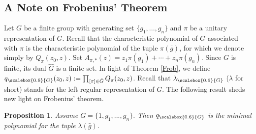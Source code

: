 \documentclass[draft, 12pt, reqno]{amsart}
\newcommand{\lb}{{\lambda}}
\numberwithin{equation}{section}
\theoremstyle{plain}
\newtheorem{proposition}[theorem]{Proposition}
\begin{document}
\subsection{A Note on Frobenius' Theorem}
Let $G$ be a finite group with generating set $\{g_1, ..., g_n\}$ and $\pi$ be a unitary representation of $G$. Recall that the characteristic polynomial of $G$ associated with $\pi$ is the characteristic polynomial of the tuple $\pi (\bar{g})$, for which we denote simply by $Q_\pi(z_0, z)$. Set $A_{\pi, *}(z)=z_1\pi(g_1)+\cdots +z_n\pi(g_n)$.
Since $G$ is finite, its dual $\hat{G}$ is a finite set. In light of Theorem \ref{Frob}, we define $q_{\scalebox{0.6}{G}}(z_0,z):=\prod_{[\pi]\in \hat{G}}Q_\pi(z_0, z)$. Recall that $\lb_{\scalebox{0.6}{G}}$ ($\lb$ for short) stands for the left regular representation of $G$. The following result sheds new light on Frobenius' theorem.
\begin{proposition}\label{minimal}
 Assume $G=\{1, g_1, ..., g_n\}$.  Then $q_{\scalebox{0.6}{G}}$ is the minimal polynomial for the tuple $\lb(\bar{g})$. 
 \end{proposition}
\end{document}
